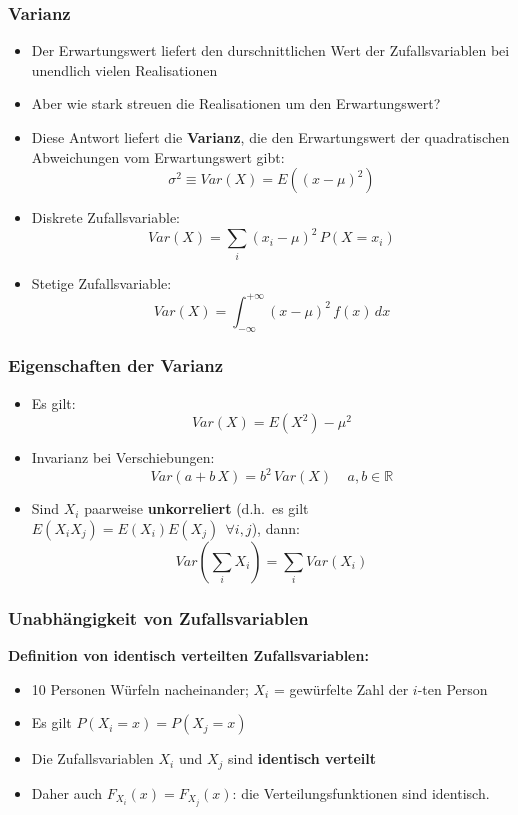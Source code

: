 \begin{frame}
    \frametitle{Varianz}

    \begin{itemize}
        \item Der Erwartungswert liefert den durschnittlichen Wert der Zufallsvariablen bei unendlich vielen Realisationen
        \item Aber wie stark streuen die Realisationen um den Erwartungswert?
        \item Diese Antwort liefert die {\bf Varianz}, die den Erwartungswert der quadratischen Abweichungen vom Erwartungswert gibt:
        $$
        \sigma^2 \equiv Var(X) = E((x-\mu)^2)
        $$
        \item Diskrete Zufallsvariable:
        $$
        Var(X) = \sum_i (x_i-\mu)^2\,P(X=x_i)
        $$
        \item Stetige Zufallsvariable:
        $$
        Var(X) = \int_{-\infty}^{+\infty} (x-\mu)^2\,f(x)\,dx
        $$
    \end{itemize}

\end{frame}


\begin{frame}
    \frametitle{Eigenschaften der Varianz}

    \begin{itemize}
        \item Es gilt:
        $$
        Var(X) = E(X^2) - \mu^2
        $$
        \item Invarianz bei Verschiebungen:
        $$
        Var(a+b\,X) = b^2\,Var(X)~~~~~a,b\in \mathbb{R}
        $$
        \item Sind $X_i$ paarweise {\bf unkorreliert} (d.h.\ es gilt $E(X_iX_j)= E(X_i)E(X_j)~~\forall i,j$), dann:
        $$
        Var(\sum_i X_i) = \sum_i Var(X_i)
        $$
    \end{itemize}

\end{frame}

\begin{frame}
    \frametitle{Unabhängigkeit von Zufallsvariablen}
\label{independent}

    {\bf Definition von identisch verteilten Zufallsvariablen:}\\

    \begin{itemize}
        \item 10 Personen Würfeln nacheinander; $X_i$ = gewürfelte Zahl der $i$-ten Person
        \item Es gilt $P(X_i=x) = P(X_j=x)$
        \item Die Zufallsvariablen $X_i$ und $X_j$ sind {\bf identisch verteilt}
        \item Daher auch $F_{X_i}(x) = F_{X_j}(x)$: die Verteilungsfunktionen sind identisch.
    \end{itemize}
    

\end{frame}

